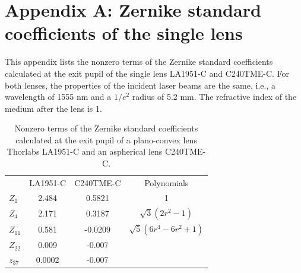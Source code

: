 \documentclass[9pt,twocolumn,twoside]{osajnl}
\begin{document}
\section*{Appendix A: Zernike standard coefficients of the single lens}
\setcounter{table}{0}
\renewcommand{\thetable}{A\arabic{table}}
This appendix lists the nonzero terms of the Zernike standard coefficients calculated at the exit pupil of the single lens LA1951-C and C240TME-C. For both lenses, the properties of the incident laser beams are the same, i.e., a wavelength of 1555 nm and a $1/e^2$ radius of 5.2 mm. The refractive index of the medium after the lens is 1.
\begin{table}[h!]
	\centering
	\begin{tabular}[c]{l c c c }
		\toprule
		\rowcolor{black!20}
		 & LA1951-C & C240TME-C & Polynomials\\
		$Z_1$ & 2.484 & 0.5821 & 1 \\
		\rowcolor{black!10}
		$Z_4$ & 2.171 & 0.3187 & $\sqrt{3}(2r^2-1)$ \\
		$Z_{11}$ & 0.581 & -0.0209 & $\sqrt{5}(6r^4-6r^2+1)$ \\
		\rowcolor{black!10}
		$Z_{22}$ & 0.009 & -0.007 & \vtop{\hbox{\strut $\sqrt{7}(20r^6-30r^4$}\hbox{\strut $+12r^2-1)$}}\\
		$z_{37}$ & 0.0002 & -0.007 & \vtop{\hbox{\strut $\sqrt{9}(70r^8-140r^6$}\hbox{\strut $+90r^4-20r^2+1)$}}\\
		\bottomrule
	\end{tabular}	
	\caption{Nonzero terms of the Zernike standard coefficients calculated at the exit pupil of a plano-convex lens Thorlabs LA1951-C and an aspherical lens C240TME-C.}\label{tab:A1}
\end{table}



\end{document}
